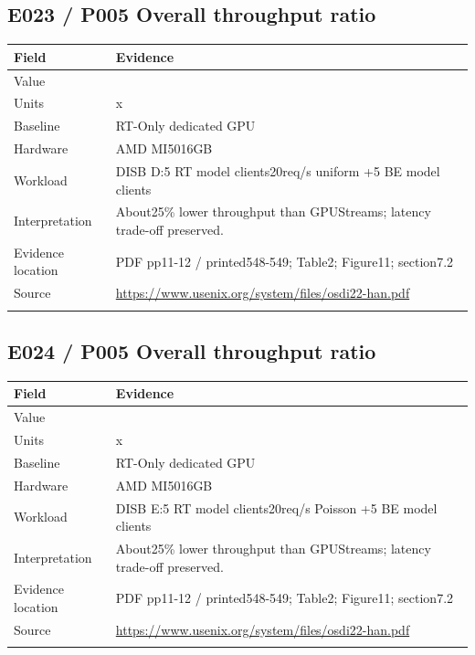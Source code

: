 \subsection*{E023 / P005 Overall throughput ratio}

\begin{longtable}{>{\raggedright\arraybackslash}p{}>{\raggedright\arraybackslash}p{}}
\toprule
\textbf{Field} & \textbf{Evidence}\\\midrule\endhead
Value & 3.00\\\addlinespace
Units & x\\\addlinespace
Baseline & RT-Only dedicated GPU\\\addlinespace
Hardware & AMD MI5016GB\\\addlinespace
Workload & DISB D:5 RT model clients20req/s uniform +5 BE model clients\\\addlinespace
Interpretation & About25\% lower throughput than GPUStreams; latency trade-off preserved.\\\addlinespace
Evidence location & PDF pp11-12 / printed548-549; Table2; Figure11; section7.2\\\addlinespace
Source & \url{https://www.usenix.org/system/files/osdi22-han.pdf}\\\addlinespace
\bottomrule\end{longtable}

\subsection*{E024 / P005 Overall throughput ratio}

\begin{longtable}{>{\raggedright\arraybackslash}p{}>{\raggedright\arraybackslash}p{}}
\toprule
\textbf{Field} & \textbf{Evidence}\\\midrule\endhead
Value & 2.96\\\addlinespace
Units & x\\\addlinespace
Baseline & RT-Only dedicated GPU\\\addlinespace
Hardware & AMD MI5016GB\\\addlinespace
Workload & DISB E:5 RT model clients20req/s Poisson +5 BE model clients\\\addlinespace
Interpretation & About25\% lower throughput than GPUStreams; latency trade-off preserved.\\\addlinespace
Evidence location & PDF pp11-12 / printed548-549; Table2; Figure11; section7.2\\\addlinespace
Source & \url{https://www.usenix.org/system/files/osdi22-han.pdf}\\\addlinespace
\bottomrule\end{longtable}

